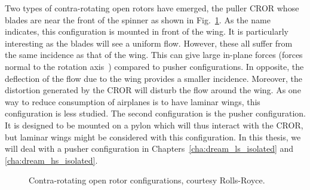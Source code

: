 Two types of contra-rotating open rotors have emerged, the
puller CROR whose blades are near the front of the spinner as 
shown in Fig.~\ref{fig:cror_configurations}. As the
name indicates, this configuration is mounted in front of the
wing. It is particularly interesting as the blades will see
a uniform flow. However, these all suffer from the same incidence as that
of the wing. This can give large in-plane forces 
(forces normal to the rotation axis~\cite{ThesisFrancois}) compared to pusher
configurations. In opposite, the deflection of the flow due to the wing provides
a smaller incidence.
Moreover, the distortion generated
by the CROR will disturb the flow around the wing. As one way to reduce
consumption of airplanes is to have laminar wings, this configuration
is less studied. The second configuration is the pusher
configuration. It is designed to be mounted on a pylon which will thus
interact with the CROR, but laminar wings might be considered with
this configuration. In this thesis, we will deal with a pusher configuration
in Chapters~\ref{cha:dream_ls_isolated} and
\ref{cha:dream_hs_isolated}.
\begin{figure}[htp]
  \centering
  \caption{Contra-rotating open rotor configurations, courtesy Rolls-Royce.}
  \label{fig:cror_configurations}
\end{figure}

